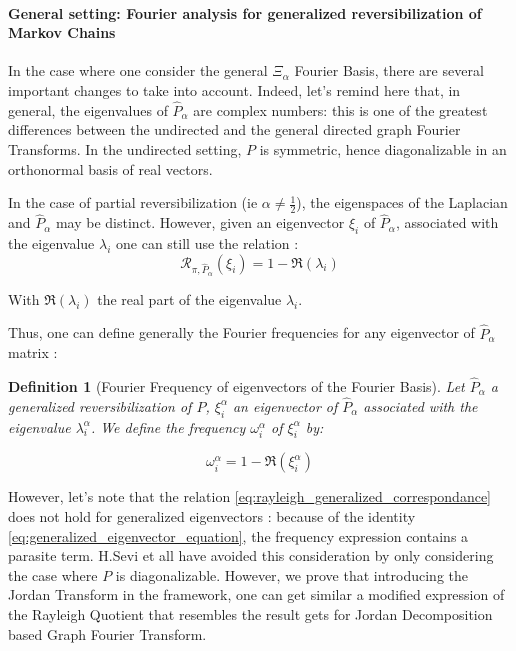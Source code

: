 \documentclass{article}
\newtheorem{definition}{Definition}[section]
\begin{document}
\paragraph{General setting: Fourier analysis for generalized reversibilization of Markov Chains}
In the case where one consider the general $\Xi_\alpha$ Fourier Basis, there are several important changes to take into account. Indeed, let's remind here that, in general, the eigenvalues of $\hat{P}_\alpha$ are complex numbers: this is one of the greatest differences between the undirected and the general directed graph Fourier Transforms. In the undirected setting, $P$ is symmetric, hence diagonalizable in an orthonormal basis of real vectors.

In the case of partial reversibilization (ie $\alpha \neq \frac{1}{2}$), the eigenspaces of the Laplacian and $\hat{P}_\alpha$ may be distinct. However, given an eigenvector $\xi_i$ of $\hat{P}_\alpha$, associated with the eigenvalue $\lambda_i$ one can still use the relation :
\begin{equation}\label{eq:rayleigh_generalized_correspondance}
    \mathcal{R}_{\pi, \hat{P}_\alpha}(\xi_i) = 1 - \Re(\lambda_i)
\end{equation}

With $\Re(\lambda_i)$ the real part of the eigenvalue $\lambda_i$.

Thus, one can define generally the Fourier frequencies for any eigenvector of $\hat{P}_\alpha$ matrix :

\begin{definition}[Fourier Frequency of eigenvectors of the Fourier Basis]

Let $\hat{P}_\alpha$ a generalized reversibilization of $P$, $\xi^\alpha_i$ an eigenvector of $\hat{P}_\alpha$ associated with the eigenvalue $\lambda^\alpha_i$. We define the frequency $\omega^\alpha_i$ of $\xi^\alpha_i$ by:

\begin{equation}
    \omega^\alpha_i = 1- \Re(\xi^\alpha_i)
\end{equation}

\end{definition}

However, let's note that the relation \ref{eq:rayleigh_generalized_correspondance} does not hold for generalized eigenvectors : because of the identity \ref{eq:generalized_eigenvector_equation}, the frequency expression contains a parasite term. H.Sevi et all \cite{sevi2019} have avoided this consideration by only considering the case where $P$ is diagonalizable. However, we prove that introducing the Jordan Transform in the \cite{sevi2019} framework, one can get similar a modified expression of the Rayleigh Quotient that resembles the result \cite{sandryhaila_moura_2014} gets for Jordan Decomposition based Graph Fourier Transform.
\end{document}
